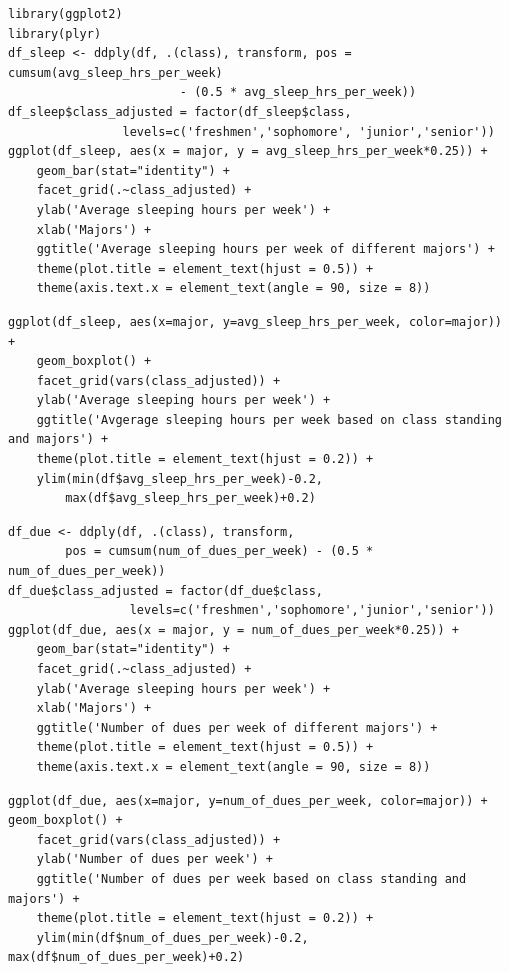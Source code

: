 \documentclass{article} %
\begin{document}
\lstset{language=R}
\lstset{frame=lines}
\lstset{basicstyle=\footnotesize}
\begin{lstlisting}
library(ggplot2)
library(plyr)
df_sleep <- ddply(df, .(class), transform, pos = cumsum(avg_sleep_hrs_per_week) 
						- (0.5 * avg_sleep_hrs_per_week)) 
df_sleep$class_adjusted = factor(df_sleep$class, 
			    levels=c('freshmen','sophomore', 'junior','senior'))
ggplot(df_sleep, aes(x = major, y = avg_sleep_hrs_per_week*0.25)) + 
	geom_bar(stat="identity") + 
	facet_grid(.~class_adjusted) +
	ylab('Average sleeping hours per week') + 
	xlab('Majors') +
	ggtitle('Average sleeping hours per week of different majors') +
	theme(plot.title = element_text(hjust = 0.5)) +
	theme(axis.text.x = element_text(angle = 90, size = 8))
\end{lstlisting}


\lstset{language=R}
\lstset{frame=lines}
\lstset{basicstyle=\footnotesize}
\begin{lstlisting}
ggplot(df_sleep, aes(x=major, y=avg_sleep_hrs_per_week, color=major)) +
	geom_boxplot() +
	facet_grid(vars(class_adjusted)) +
	ylab('Average sleeping hours per week') +
	ggtitle('Avgerage sleeping hours per week based on class standing and majors') +
	theme(plot.title = element_text(hjust = 0.2)) +
	ylim(min(df$avg_sleep_hrs_per_week)-0.2, 
		max(df$avg_sleep_hrs_per_week)+0.2)
\end{lstlisting}


\lstset{language=R}
\lstset{frame=lines}
\lstset{basicstyle=\footnotesize}
\begin{lstlisting}
df_due <- ddply(df, .(class), transform, 
		pos = cumsum(num_of_dues_per_week) - (0.5 * num_of_dues_per_week)) 
df_due$class_adjusted = factor(df_due$class,
				 levels=c('freshmen','sophomore','junior','senior'))
ggplot(df_due, aes(x = major, y = num_of_dues_per_week*0.25)) + 
	geom_bar(stat="identity") + 
	facet_grid(.~class_adjusted) +
	ylab('Average sleeping hours per week') + 
	xlab('Majors') +
	ggtitle('Number of dues per week of different majors') +
	theme(plot.title = element_text(hjust = 0.5)) +
	theme(axis.text.x = element_text(angle = 90, size = 8))
\end{lstlisting}


\lstset{language=R}
\lstset{frame=lines}
\lstset{basicstyle=\footnotesize}
\begin{lstlisting}
ggplot(df_due, aes(x=major, y=num_of_dues_per_week, color=major)) +
geom_boxplot() +
	facet_grid(vars(class_adjusted)) +
	ylab('Number of dues per week') +
	ggtitle('Number of dues per week based on class standing and majors') +
	theme(plot.title = element_text(hjust = 0.2)) +
	ylim(min(df$num_of_dues_per_week)-0.2, max(df$num_of_dues_per_week)+0.2)
\end{lstlisting}
\end{document}
